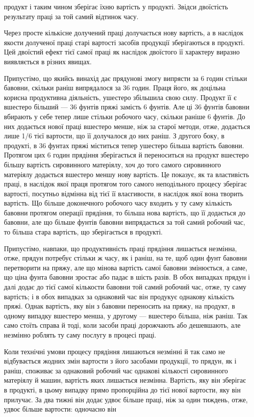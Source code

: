 \parcont{}  %
продукт і таким чином зберігає їхню вартість у продукті. Звідси
двоїстість результату праці за той самий відтинок часу.

Через просте кількісне долучений праці долучається нову
вартість, а в наслідок якости долученої праці старі вартості засобів
продукції зберігаються в продукті. Цей двоїстий ефект тієї
самої праці як наслідок двоїстого її характеру виразно виявляється
в різних явищах.

Припустімо, що якийсь винахід дає прядунові змогу випрясти
за 6 годин стільки бавовни, скільки раніш випрядалося за 36 годин.
Праця його, як доцільна корисна продуктивна діяльність,
ушестеро збільшила свою силу. Продукт її є вшестеро більший —
36 фунтів пряжі замість 6 фунтів. Але ці 36 фунтів бавовни вбирають
у себе тепер лише стільки робочого часу, скільки раніше
6 фунтів. До них додається нової праці вшестеро менше, ніж за
старої методи, отже, додається лише 1/6 тієї вартости, що її долучалося
до них раніш. З другого боку, в продукті, в 36 фунтах
пряжі міститься тепер ушестеро більша вартість бавовни. Протягом
цих 6 годин прядіння зберігається й переноситься на продукт
вшестеро більшу вартість сировинного матеріялу, хоч до
того самого сировинного матеріялу додається вшестеро меншу
нову вартість. Це показує, як та властивість праці, в наслідок
якої праця протягом того самого неподільного процесу зберігає
вартості, посутньо відмінна від тієї її власгивости, в наслідок
якої вона творить вартість. Що більше доконечного робочого
часу входить у ту саму кількість бавовни протягом операції
прядіння, то більша нова вартість, що її додається до бавовни,
але що більше фунтів бавовни випрядається за той самий робочий
час, то більша стара вартість, що зберігається в продукті.

Припустімо, навпаки, що продуктивність праці прядіння лишається
незмінна, отже, прядун потребує стільки ж часу, як і раніш,
на те, щоб один фунт бавовни перетворити на пряжу, але що
мінова вартість самої бавовни змінюється, а саме, що ціна фунта
бавовни зростає або падає в шість разів. В обох випадках прядун
і далі додає до тієї самої кількости бавовни той самий робочий
час, отже, ту саму вартість; і в обох випадках за однаковий час
він продукує однакову кількість пряжі. Однак вартість, яку він
з бавовни переносить на пряжу, на продукт, в одному випадку
вшестеро менша, у другому — вшестеро більша, ніж раніш. Так
само стоїть справа й тоді, коли засоби праці дорожчають або
дешевшають, але незмінно роблять ту саму послугу в процесі
праці.

Коли технічні умови процесу прядіння лишаються незмінні
й так само не відбувається жодних змін вартости з його засобами
продукції, то прядун, як і раніш, споживає за однаковий робочий
час однакові кількості сировинного матеріялу й машин, вартість
яких лишається незмінна. Вартість, яку він зберігає в продукті,
в цьому випадку прямо пропорційна до тієї нової вартости, яку
він прилучає. За два тижні він додає удвоє більше праці, ніж
за один тиждень, отже, удвоє більше вартости: одночасно він
\parbreak{}  %
